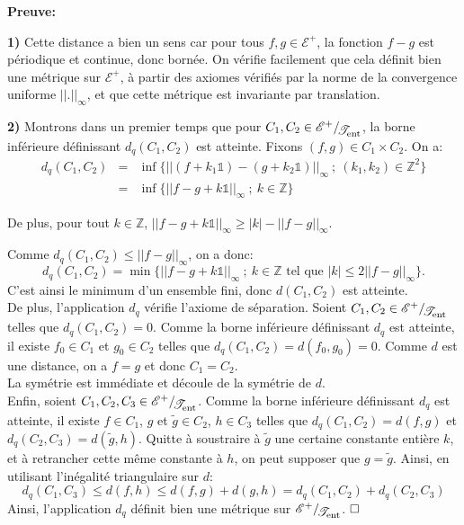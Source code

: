\documentclass[11pt,a4 paper]{article}
\newcommand{\Zbb}{\mathbb{Z}}
\newcommand{\Ec}{\mathcal{E}}
\newcommand{\Tent}{\mathcal{T}_{\mathrm{ent}}}
\newcommand*{\EnsembleQuotient}[2]%
{\ensuremath{%
		#1/\!\raisebox{-.65ex}{\ensuremath{\mathcal{#2}}}}}
\begin{document}
	\textbf{Preuve:}
	\par\textbf{1)} Cette distance a bien un sens car pour tous $f,g \in \Ec^+$, la fonction $f-g$ est périodique et continue, donc bornée. On vérifie facilement que cela définit bien une métrique sur $\Ec^+$, à partir des axiomes vérifiés par la norme de la convergence uniforme $||.||_{\infty}$, et que cette métrique est invariante par translation.\\
	
	\par\textbf{2)} Montrons dans un premier temps que pour $C_1, C_2 \in \EnsembleQuotient{\mathcal{E}^+}{\Tent}$, la borne inférieure définissant $d_q(C_1,C_2)$ est atteinte. Fixons $(f,g) \in C_1 \times C_2$. On a:
		\begin{eqnarray*}
		d_q(C_1,C_2)&=&\inf\big\lbrace ||(f+k_1\mathds{1})-(g+k_2\mathds{1})||_\infty\ ;\ (k_1,k_2)\in \Zbb^2\big\rbrace\\
		&=&\inf \big\lbrace ||f-g+k\mathds{1}||_\infty\ ;\ k \in \Zbb\big\rbrace
	\end{eqnarray*}
	
	
	De plus, pour  tout $k \in \Zbb$, $||f-g +k\mathds{1}||_\infty\geq |k|-||f-g||_\infty$.
	
	Comme $d_q(C_1,C_2)\leq ||f-g||_\infty$, on a donc:
	$$d_q(C_1,C_2)= \min \lbrace ||f-g+k\mathds{1}||_\infty\ ;\ k \in \Zbb \text{ tel que } |k|\leq 2||f-g||_\infty\rbrace.$$
	C'est ainsi le minimum d'un ensemble fini, donc $d(C_1,C_2)$ est atteinte.\\
	
	De plus, l'application $d_q$ vérifie l'axiome de séparation. Soient $C_1, C_2 \in \EnsembleQuotient{\mathcal{E}^+}{\Tent}$ telles que $d_q(C_1,C_2) = 0$. Comme la borne inférieure définissant $d_q$ est atteinte, il existe $f_0 \in C_1$ et $g_0 \in C_2$ telles que $d_q(C_1,C_2)=d(f_0,g_0)=0$. Comme $d$ est une distance, on a $f=g$ et donc $C_1 = C_2$.\\
	
	La symétrie est immédiate et découle de la symétrie de $d$.\\
	
	Enfin, soient $C_1, C_2, C_3 \in \EnsembleQuotient{\mathcal{E}^+}{\Tent}$. Comme la borne inférieure définissant $d_q$ est atteinte, il existe $f\in C_1$, $g$ et $\widetilde{g} \in C_2$, $h \in C_3$ telles que $d_q(C_1,C_2)=d(f,g)$ et $d_q(C_2,C_3)=d(\widetilde{g},h)$. Quitte à soustraire à $\widetilde{g}$ une certaine constante entière $k$, et à retrancher cette même constante à $h$, on peut supposer que $g=\widetilde{g}$. Ainsi, en utilisant l'inégalité triangulaire sur $d$:
	$$d_q(C_1,C_3)\leq d(f,h) \leq d(f,g)+d(g,h)= d_q(C_1,C_2)+d_q(C_2,C_3)$$
	Ainsi, l'application $d_q$ définit bien une métrique sur $\EnsembleQuotient{\mathcal{E}^+}{\Tent}$. $\hfill \square$\\
\end{document}
